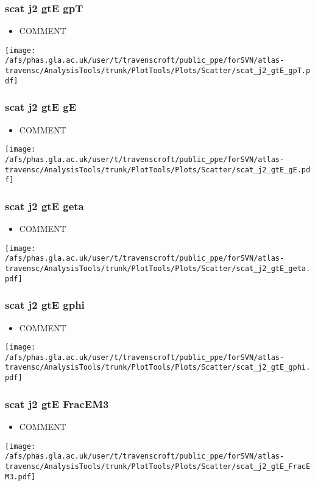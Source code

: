 \documentclass{beamer}
\begin{document}
\begin{frame}
\frametitle{scat j2 gtE gpT}
\begin{itemize}
\item COMMENT
\end{itemize}
\begin{center}
\texttt{[image: /afs/phas.gla.ac.uk/user/t/travenscroft/public\_ppe/forSVN/atlas-travensc/AnalysisTools/trunk/PlotTools/Plots/Scatter/scat\_j2\_gtE\_gpT.pdf]}
\end{center}
\end{frame}

\begin{frame}
\frametitle{scat j2 gtE gE}
\begin{itemize}
\item COMMENT
\end{itemize}
\begin{center}
\texttt{[image: /afs/phas.gla.ac.uk/user/t/travenscroft/public\_ppe/forSVN/atlas-travensc/AnalysisTools/trunk/PlotTools/Plots/Scatter/scat\_j2\_gtE\_gE.pdf]}
\end{center}
\end{frame}

\begin{frame}
\frametitle{scat j2 gtE geta}
\begin{itemize}
\item COMMENT
\end{itemize}
\begin{center}
\texttt{[image: /afs/phas.gla.ac.uk/user/t/travenscroft/public\_ppe/forSVN/atlas-travensc/AnalysisTools/trunk/PlotTools/Plots/Scatter/scat\_j2\_gtE\_geta.pdf]}
\end{center}
\end{frame}

\begin{frame}
\frametitle{scat j2 gtE gphi}
\begin{itemize}
\item COMMENT
\end{itemize}
\begin{center}
\texttt{[image: /afs/phas.gla.ac.uk/user/t/travenscroft/public\_ppe/forSVN/atlas-travensc/AnalysisTools/trunk/PlotTools/Plots/Scatter/scat\_j2\_gtE\_gphi.pdf]}
\end{center}
\end{frame}

\begin{frame}
\frametitle{scat j2 gtE FracEM3}
\begin{itemize}
\item COMMENT
\end{itemize}
\begin{center}
\texttt{[image: /afs/phas.gla.ac.uk/user/t/travenscroft/public\_ppe/forSVN/atlas-travensc/AnalysisTools/trunk/PlotTools/Plots/Scatter/scat\_j2\_gtE\_FracEM3.pdf]}
\end{center}
\end{frame}
\end{document}
